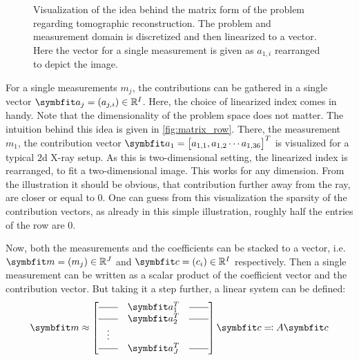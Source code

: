 \begin{figure}
	\centering
	\resizebox{0.7\textwidth}{!}{%
		
	}%
	\caption{Visualization of the idea behind the matrix form of the problem regarding
		tomographic reconstruction. The problem and measurement domain is discretized and
		then linearized to a vector. Here the vector for a single measurement is given as
		\(a_{1,i}\) rearranged to depict the image.}\label{fig:matrix_row}
\end{figure}

For a single measurements \(m_j\), the contributions can be gathered in a single vector \(\mvec{a}_j
= (a_{j,i}) \in \mathbb{R}^I\). Here, the choice of linearized index comes in handy. Note that the
dimensionality of the problem space does not matter. The intuition behind this idea is given in
\autoref{fig:matrix_row}. There, the measurement \(m_1\), the contribution vector \(\mvec{a}_{1} =
\begin{bmatrix}a_{1, 1}, a_{1, 2} \cdots a_{1,36}\end{bmatrix}^T\) is visualized for a typical
\(2\)d X-ray setup. As this is two-dimensional setting, the linearized index is rearranged, to fit a
two-dimensional image. This works for any dimension. From the illustration it should be obvious,
that contribution further away from the ray, are closer or equal to \(0\). One can guess from this
visualization the sparsity of the contribution vectors, as already in this simple illustration,
roughly half the entries of the row are \(0\).

Now, both the measurements and the coefficients can be stacked to a vector, i.e.\ \(\mvec{m} = (m_j)
\in \mathbb{R}^J\) and \(\mvec{c} = (c_i) \in \mathbb{R}^I\) respectively. Then a single measurement
can be written as a scalar product of the coefficient vector and the contribution vector. But taking
it a step further, a linear system can be defined:
\begin{equation}\label{eq:system_lin_equation}
	\mvec{m} \approx
	\begin{bmatrix}
		\rule[.5ex]{2em}{0.4pt} & \mvec{a}_1^T & \rule[.5ex]{2em}{0.4pt} \\
		\rule[.5ex]{2em}{0.4pt} & \mvec{a}_2^T & \rule[.5ex]{2em}{0.4pt} \\
		\vdots                                                           \\
		\rule[.5ex]{2em}{0.4pt} & \mvec{a}_J^T & \rule[.5ex]{2em}{0.4pt}
	\end{bmatrix} \mvec{c} \eqcolon A \mvec{c}
\end{equation}

